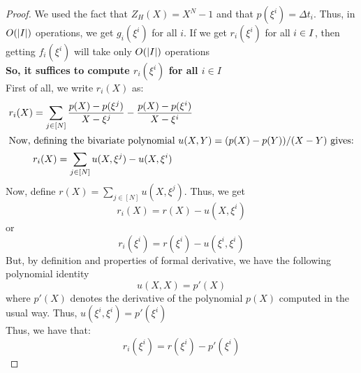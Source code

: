 \begin{proof}
    We used the fact that $Z_H(X)=X^N-1$ and that $p(\xi^i)=\Delta t_i$.
    Thus, in $O(|I|)$ operations, we get $g_i(\xi^i)$ for all $i$.
    If we get $r_i(\xi^i)$ for all $i \in I$, then getting $f_i(\xi^i)$ will take only $O(|I|)$ operations\\
    \textbf{So, it suffices to compute $r_i(\xi^i)$ for all $i \in I$}\\

    First of all, we write $r_i(X)$ as:
    \begin{align}\label{eq:rx}
    r_i(X) &= \sum_{j\in [N]}\frac{p(X)-p(\xi^j)}{X-\xi^j} - \frac{p(X)-p(\xi^i)}{X-\xi^i} \nonumber \\
    \intertext{Now, defining the bivariate polynomial $u(X,Y)=(p(X) - p(Y))/(X-Y)$ gives:}
    &r_i(X)= \sum_{j\in [N]}u(X,\xi^j) - u(X,\xi^i) \nonumber
    \end{align}
    Now, define $r(X)=\sum_{j\in [N]}u(X,\xi^j)$.
    Thus, we get
    $$r_i(X)=r(X)-u(X, \xi^i)$$
    or
    $$r_i(\xi^i)=r(\xi^i) - u(\xi^i,\xi^i)$$
    But, by definition and properties of formal derivative, we have the following polynomial identity
    $$u(X, X)= p'(X)$$
    where $p'(X)$ denotes the derivative of the polynomial $p(X)$ computed in the usual way. Thus, $u(\xi^i, \xi^i)=p'(\xi^i)$\\
    Thus, we have that:
    $$r_i(\xi^i)=r(\xi^i) - p'(\xi^i) $$


\end{proof}
